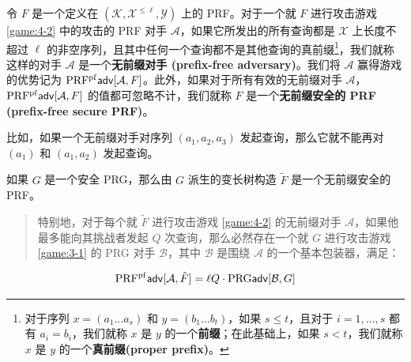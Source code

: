 \begin{definition}
令 $F$ 是一个定义在 $(\mathcal{K},\mathcal{X}^{\leq\ell}, \mathcal{Y})$ 上的 PRF。对于一个就 $F$ 进行攻击游戏 \ref{game:4-2} 中的攻击的 PRF 对手 $\mathcal{A}$，如果它所发出的所有查询都是 $\mathcal{X}$ 上长度不超过 $\ell$ 的非空序列，且其中任何一个查询都不是其他查询的真前缀\footnote[3]{对于序列 $x=(a_1\dots a_s)$ 和 $y=(b_1\dots b_t)$，如果 $s\leq t$，且对于 $i=1,\dots,s$ 都有 $a_i=b_i$，我们就称 $x$ 是 $y$ 的一个\textbf{前缀}；在此基础上，如果 $s<t$，我们就称 $x$ 是 $y$ 的一个\textbf{真前缀(proper prefix)}。}，我们就称这样的对手 $\mathcal{A}$ 是一个\textbf{无前缀对手 (prefix-free adversary)}。我们将 $\mathcal{A}$ 赢得游戏的优势记为 ${\rm PRF^{pf}\mathsf{adv}}[\mathcal{A},F]$。此外，如果对于所有有效的无前缀对手 $\mathcal{A}$，${\rm PRF^{pf}\mathsf{adv}}[\mathcal{A},F]$ 的值都可忽略不计，我们就称 $F$ 是一个\textbf{无前缀安全的 PRF (prefix-free secure PRF)}。
\end{definition}

比如，如果一个无前缀对手对序列 $(a_1,a_2,a_3)$ 发起查询，那么它就不能再对 $(a_1)$ 和 $(a_1,a_2)$ 发起查询。

\begin{theorem}
如果 $G$ 是一个安全 PRG，那么由 $G$ 派生的变长树构造 $\tilde F$ 是一个无前缀安全的 PRF。
\begin{quote}
特别地，对于每个就 $\tilde F$ 进行攻击游戏 \ref{game:4-2} 的无前缀对手 $\mathcal{A}$，如果他最多能向其挑战者发起 $Q$ 次查询，那么必然存在一个就 $G$ 进行攻击游戏 \ref{game:3-1} 的 PRG 对手 $\mathcal{B}$，其中 $\mathcal{B}$ 是围绕 $\mathcal{A}$ 的一个基本包装器，满足：
\end{quote}
\[
{\rm PRF^{pf}\mathsf{adv}}[\mathcal{A},\tilde{F}]=\ell Q\cdot{\rm PRG\mathsf{adv}}[\mathcal{B},G]
\]
\end{theorem}

